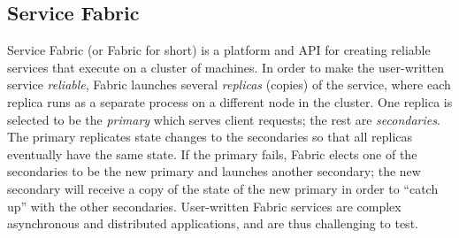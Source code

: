 

\subsection{\Azure Service Fabric}
\label{sec:cases:fabric}

\Azure Service Fabric
(or Fabric for short) is a platform and API for creating reliable services that execute on a cluster of machines. 
In order to make the user-written service \emph{reliable}, Fabric launches several \emph{replicas} (copies) of the service, where each replica runs as a separate process on a different node in the cluster.
One replica is selected to be the \emph{primary} which serves client requests; the rest are \emph{secondaries}. The primary replicates state changes to the secondaries 
so that all replicas eventually have the same state. 
If the primary fails,
Fabric elects one of the secondaries to be the new primary and launches another secondary; the new secondary will receive 
a copy
of the state of the new primary in order to ``catch up'' with the other secondaries. 
User-written Fabric services are complex asynchronous and distributed applications, and are thus challenging to test.

